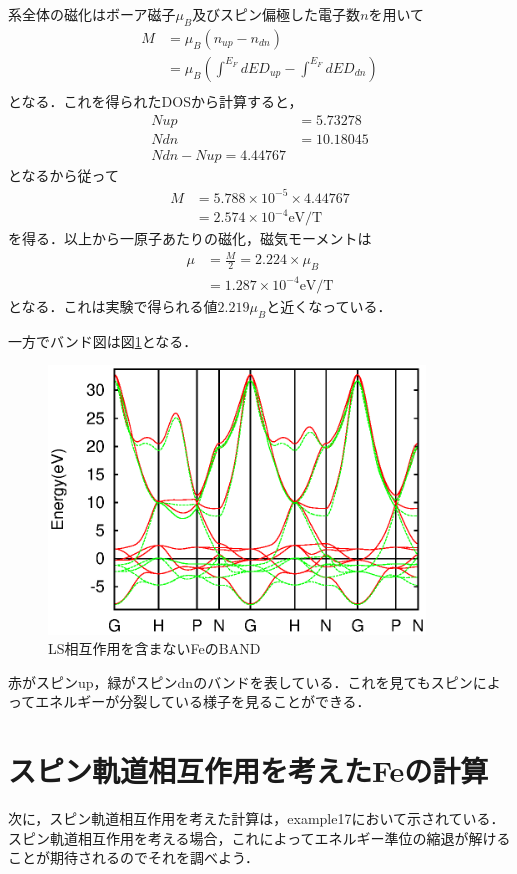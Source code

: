 \documentclass[a4j]{jarticle}
\begin{document}
系全体の磁化はボーア磁子$\mu_B$及びスピン偏極した電子数$n$を用いて
\begin{align*}
 M&=\mu_B\left(n_{up}-n_{dn}\right) \\
&=\mu_B\left(\int^{E_F}dED_{up}-\int^{E_F}dED_{dn}\right) \\
\end{align*}
となる．これを得られたDOSから計算すると，
\begin{align*}
 Nup&= 5.73278 \\
 Ndn&=10.18045 \\
 Ndn-Nup=4.44767
\end{align*}
となるから従って
\begin{align*}
 M&=5.788\times 10^{-5}\times 4.44767 \\
  &=2.574\times 10^{-4}\mathrm{eV/T}
\end{align*}
を得る．以上から一原子あたりの磁化，磁気モーメントは
\begin{align*}
 \mu&=\frac{M}{2}=2.224\times \mu_B \\
    &=1.287\times 10^{-4}\mathrm{eV/T}
\end{align*}
となる．これは実験で得られる値$2.219\mu_B$と近くなっている．

一方でバンド図は図\ref{121206_4Jul19}となる．
\begin{figure}[htb]
\centering
 \includegraphics[width=10cm]{band.eps}
\caption{LS相互作用を含まないFeのBAND}
\label{121206_4Jul19}
\end{figure}
赤がスピンup，緑がスピンdnのバンドを表している．これを見てもスピンによってエネルギーが分裂している様子を見ることができる．

\section{スピン軌道相互作用を考えたFeの計算}
次に，スピン軌道相互作用を考えた計算は，example17において示されている．スピン軌道相互作用を考える場合，これによってエネルギー準位の縮退が解けることが期待されるのでそれを調べよう．
\end{document}
